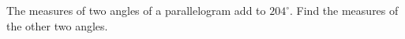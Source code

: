 The measures of two angles of a parallelogram add to $204^\circ$. Find the measures of the other two angles.
